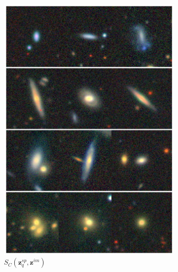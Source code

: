 \documentclass[a4paper,12pt]{article}
\begin{document}
\begin{figure}[H]
\begin{subfigure}{0.22\textwidth}
        \includegraphics[height=0.21\textheight]{../figures/images_im_sp.png}
        \caption{$S_C(\mathbf{z}_q^{sp}, \mathbf{z}^{im})$}
        \label{fig:retrieval_4}
    \end{subfigure}%
    \hfill
    \begin{subfigure}{0.22\textwidth}
        \centering

\end{subfigure}
\end{figure}
\end{document}
